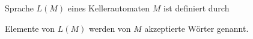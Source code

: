\begin{definition}{Sprache $L(M)$} eines Kellerautomaten $M$ ist definiert durch

    Elemente von $L(M)$ werden von $M$ akzeptierte Wörter genannt.
\end{definition}

